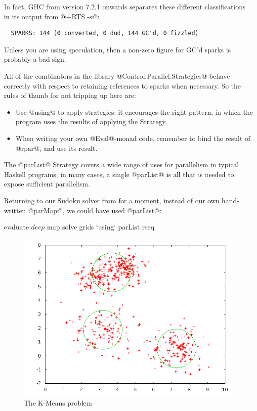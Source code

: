 In fact, GHC from version 7.2.1 onwards separates these different
classifications in its output from @+RTS -s@:

{\small \begin{verbatim}
  SPARKS: 144 (0 converted, 0 dud, 144 GC'd, 0 fizzled)
\end{verbatim}}

\noindent Unless you are using speculation, then a non-zero figure for
GC'd sparks is probably a bad sign.

All of the combinators in the library @Control.Parallel.Strategies@
behave correctly with respect to retaining references to sparks when
necessary.  So the rules of thumb for not tripping up here are:

\begin{itemize}
\item Use @using@ to apply strategies: it encourages the right
  pattern, in which the program uses the results of applying the
  Strategy.
\item When writing your own @Eval@-monad code, remember to bind the
  result of @rpar@, and use its result.
\end{itemize}


The @parList@ Strategy covers a wide range of uses for parallelism in
typical Haskell programs; in many cases, a single @parList@ is all
that is needed to expose sufficient parallelism.

Returning to our Sudoku solver from  for a moment,
instead of our own hand-written @parMap@, we could have used
@parList@:

\begin{haskell}
    evaluate $ deep $ map solve grids `using` parList rseq
\end{haskell}

\begin{figure}
\begin{center}
\includegraphics[scale=0.5]{kmeans-example.png}
\end{center}
\caption{The K-Means problem}
\label{fig:kmeans-example}
\end{figure}

